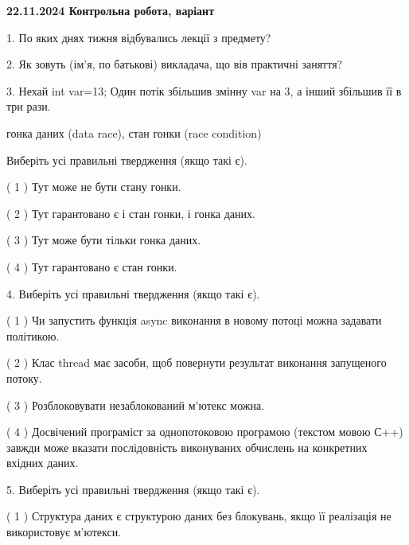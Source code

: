 \documentclass[12pt, ukrainian]{article}
\begin{document}
\vspace{4mm}
\newpage
\begin {large}

\textbf{22.11.2024 Контрольна робота, варіант  }\par


{
1. По яких днях тижня відбувались лекції з предмету?



\vspace{5mm}
2. Як зовуть (ім'я, по батькові) викладача, що вів практичні заняття?



\vspace{5mm}
3. Нехай int var=13; Один потік збільшив змінну var на 3, а інший збільшив її в три рази.

гонка даних (data race), стан гонки (race condition)

Виберіть усі правильні твердження (якщо такі є).\par
\vspace{2mm}
( 1 ) Тут може не бути стану гонки.%

( 2 ) Тут гарантовано є і стан гонки, і гонка даних.%

( 3 ) Тут може бути тільки гонка даних.%

( 4 ) Тут гарантовано є стан гонки.%


\vspace{5mm}
4. Виберіть усі правильні твердження (якщо такі є).\par
\vspace{2mm}

( 1 ) Чи запустить функція  async виконання в новому потоці можна задавати політикою.%

( 2 ) Клас thread має засоби, щоб повернути результат виконання запущеного потоку.%

( 3 ) Розблоковувати незаблокований м’ютекс можна.%

( 4 ) Досвічений програміст за однопотоковою програмою (текстом мовою С++) завжди може вказати послідовність виконуваних обчислень на конкретних вхідних даних.%


\vspace{5mm}
5. Виберіть усі правильні твердження (якщо такі є).\par
\vspace{2mm}

( 1 ) Структура даних є структурою даних без блокувань, якщо її реалізація не використовує м’ютекси.%

}
\end{large}
\end{document}
